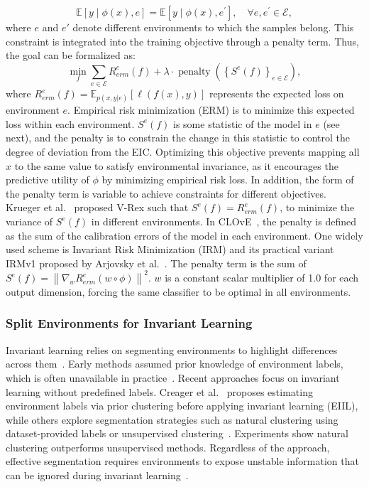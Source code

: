 \begin{equation}
\mathbb{E}\left[y \mid \phi(x), e\right] = \mathbb{E}\left[y \mid \phi(x), e^{\prime}\right], \quad \forall e, e^{\prime} \in \mathcal{E},
\end{equation}
where $e$ and $e'$ denote different environments to which the samples belong. This constraint is integrated into the training objective through a penalty term. Thus, the goal can be formalized as:
\begin{equation}
\min _f\sum_{e \in \mathcal{E}} R^e_{erm}(f)+\lambda \cdot \operatorname{penalty}\left(\left\{S^e(f)\right\}_{e \in \mathcal{E}}\right),
\end{equation}
where $R^e_{erm}(f) = \mathbb{E}_{p(x,y|e)}[\ell(f(x),y)]$ represents the expected loss on environment $e$. Empirical risk minimization (ERM) is to minimize this expected loss within each environment. $S^e(f)$ is some statistic of the model in $e$ (see next), and the penalty is to constrain the change in this statistic to control the degree of deviation from the EIC. Optimizing this objective prevents mapping all $x$ to the same value to satisfy environmental invariance, as it encourages the predictive utility of $\phi$ by minimizing empirical risk loss. In addition, the form of the penalty term is variable to achieve constraints for different objectives. Krueger et al.~\cite{v-rex} proposed V-Rex such that $S^e(f)=R^e_{erm}(f)$, to minimize the variance of $S^e(f)$ in different environments. In CLOvE~\cite{causal_ir}, the penalty is defined as the sum of the calibration errors of the model in each environment. One widely used scheme is Invariant Risk Minimization (IRM) and its practical variant IRMv1 proposed by Arjovsky et al.~\cite{IRM_training}. The penalty term is the sum of $S^e(f)=\left\|\nabla_w R^e_{erm}(w \circ \phi)\right\|^2$. $w$ is a constant scalar multiplier of 1.0 for each output dimension, forcing the same classifier to be optimal in all environments. 

\subsubsection{Split Environments for Invariant Learning}
Invariant learning relies on segmenting environments to highlight differences across them~\cite{IR_intro}. Early methods assumed prior knowledge of environment labels, which is often unavailable in practice~\cite{bottleneck_ir, empirical_ir,environment_label,inaccessible_label_2}. Recent approaches focus on invariant learning without predefined labels. Creager et al.~\cite{EIC} proposes estimating environment labels via prior clustering before applying invariant learning (EIIL), while others explore segmentation strategies such as natural clustering using dataset-provided labels or unsupervised clustering~\cite{unshuffling}. Experiments show natural clustering outperforms unsupervised methods. Regardless of the approach, effective segmentation requires environments to expose unstable information that can be ignored during invariant learning~\cite{IR_intro}.

